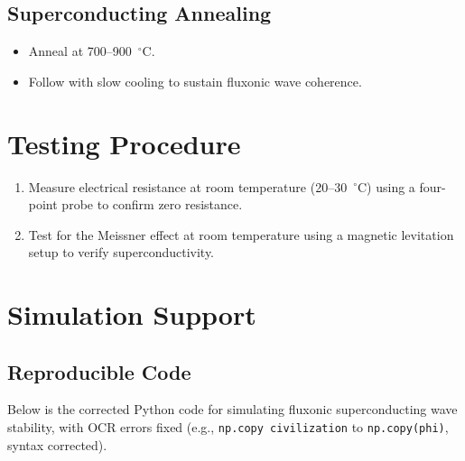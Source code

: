 \documentclass[a4paper,12pt]{article}
\begin{document}
\subsection{Superconducting Annealing}
\begin{itemize}
    \item Anneal at 700--900~$^\circ$C.
    \item Follow with slow cooling to sustain fluxonic wave coherence.
\end{itemize}

\section{Testing Procedure}
\begin{enumerate}
    \item Measure electrical resistance at room temperature (20--30~$^\circ$C) using a four-point probe to confirm zero resistance.
    \item Test for the Meissner effect at room temperature using a magnetic levitation setup to verify superconductivity.
\end{enumerate}

\section{Simulation Support}
\subsection{Reproducible Code}
Below is the corrected Python code for simulating fluxonic superconducting wave stability, with OCR errors fixed (e.g., \texttt{np.copy civilization} to \texttt{np.copy(phi)}, syntax corrected).
\end{document}
